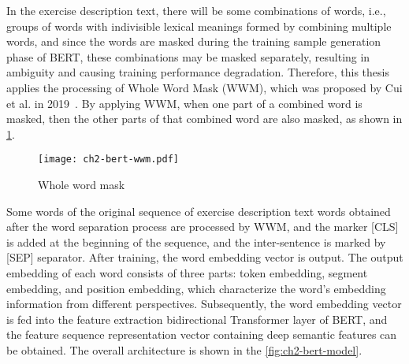 

In the exercise description text, there will be some combinations of words, i.e., groups of words with indivisible lexical meanings formed by combining multiple words, and since the words are masked during the training sample generation phase of BERT, these combinations may be masked separately, resulting in ambiguity and causing training performance degradation. Therefore, this thesis applies the processing of Whole Word Mask (WWM), which was proposed by Cui et al. in 2019~\cite{cui2019pre}. By applying WWM, when one part of a combined word is masked, then the other parts of that combined word are also masked, as shown in \figurename{\ref{fig:ch2-bert-wwm}}.

\begin{figure}[htbp!]
	\centering
	\texttt{[image: ch2-bert-wwm.pdf]}
	\caption{Whole word mask}\label{fig:ch2-bert-wwm}
\end{figure}


Some words of the original sequence of exercise description text words obtained after the word separation process are processed by WWM, and the marker [CLS] is added at the beginning of the sequence, and the inter-sentence is marked by [SEP] separator. After training, the word embedding vector is output. The output embedding of each word consists of three parts: token embedding, segment embedding, and position embedding, which characterize the word's embedding information from different perspectives. Subsequently, the word embedding vector is fed into the feature extraction bidirectional Transformer layer of BERT, and the feature sequence representation vector containing deep semantic features can be obtained. The overall architecture is shown in the \figurename{\ref{fig:ch2-bert-model}}.

